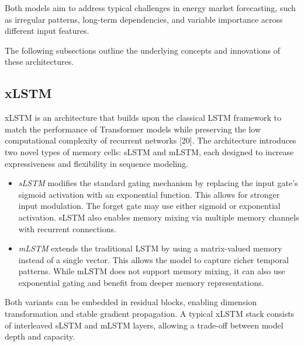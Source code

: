 \documentclass[class=scrbook, crop=false]{standalone}
\begin{document}
Both models aim to address typical challenges in energy market forecasting, such as irregular patterns, long-term dependencies, and variable importance across different input features.

The following subsections outline the underlying concepts and innovations of these architectures.





\subsection{xLSTM}
\label{Section::xLSTM}
\gls{xLSTM} is an architecture that builds upon the classical LSTM framework to match the performance of Transformer models while preserving the low computational complexity of recurrent networks [20]. The architecture introduces two novel types of memory cells: sLSTM and mLSTM, each designed to increase expressiveness and flexibility in sequence modeling.
\begin{itemize}
\item \textit{sLSTM} modifies the standard gating mechanism by replacing the input gate's sigmoid activation with an exponential function. This allows for stronger input modulation. The forget gate may use either sigmoid or exponential activation. sLSTM also enables memory mixing via multiple memory channels with recurrent connections.
\item \textit{mLSTM} extends the traditional LSTM by using a matrix-valued memory instead of a single vector. This allows the model to capture richer temporal patterns. While mLSTM does not support memory mixing, it can also use exponential gating and benefit from deeper memory representations.
\end{itemize}

Both variants can be embedded in residual blocks, enabling dimension transformation and stable gradient propagation. A typical xLSTM stack consists of interleaved sLSTM and mLSTM layers, allowing a trade-off between model depth and capacity.
\end{document}
